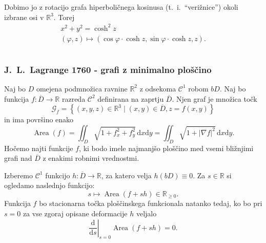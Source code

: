 \documentclass[8pt]{beamer}
\theoremstyle{definition}
\theoremstyle{remark}
\theoremstyle{plain}
\numberwithin{equation}{section}  %
\begin{document}
\begin{frame}
\begin{columns}
\begin{column}{0.5\textwidth}
            \vspace{0.8em}

            Dobimo jo z rotacijo grafa hiperboličnega kosinusa (t.~i.~“verižnice”) okoli izbrane osi v $\mathbb{R}^3$. Torej
            \begin{gather*}
                x^2+y^2=\cosh^2{z} \\
                (\varphi, z) \mapsto(\cos \varphi \cdot \cosh z, \sin \varphi \cdot \cosh z, z).
            \end{gather*}

        \end{column}
    \end{columns}

\end{frame}

\begin{frame}
    \frametitle{J.~L.~Lagrange 1760 - grafi z minimalno ploščino}

    Naj bo $D$ omejena podmnožica ravnine $\mathbb{R}^2$ z odsekoma $\mathscr{C}^1$ robom $b D$. Naj bo funkcija $f: \overline{D} \rightarrow \mathbb{R}$ razreda $\mathscr{C}^2$ definirana na zaprtju $\overline{D}$. Njen graf je množica točk
    \begin{equation*}
        \mathcal{G}_f=\left\{(x, y, z) \in \mathbb{R}^3 \mid(x, y) \in \overline{D}, z=f(x, y)\right\}    
    \end{equation*}
    in ima površino enako
    \begin{equation*}
        \operatorname{Area}(f)=\iint_{D} \sqrt{1+f_x^2+f_y^2} \, \mathrm{d} x \mathrm{d} y=\iint_{D} \sqrt{1+|\nabla f|^2} \, \mathrm{d} x \mathrm{d} y.    
    \end{equation*}
    Hočemo najti funkcije $f$, ki bodo imele najmanjšo ploščino med vsemi bližnjimi grafi nad $\overline{D}$ z enakimi robnimi vrednostmi.

    \vspace{0.8em}

    Izberemo $\mathscr{C}^1$ funkcijo $h: \overline{D} \rightarrow \mathbb{R}$, za katero velja $h(b D) \equiv 0$. Za $s \in \mathbb{R}$ si ogledamo naslednjo funkcijo:
    \begin{equation*}
        s \longmapsto \operatorname{Area}(f+s h) \in \mathbb{R}_{\geq 0} .    
    \end{equation*}
    Funkcija $f$ bo stacionarna točka \textcolor{red1}{ploščinskega funkcionala} natanko tedaj, ko bo pri $s=0$ za vse zgoraj opisane deformacije $h$ veljalo
    \begin{equation*}
        \left.\frac{\mathrm{d}}{\mathrm{d} s}\right|_{s=0} \operatorname{Area}(f+s h)=0.
    \end{equation*}
    
\end{frame}
\end{document}
